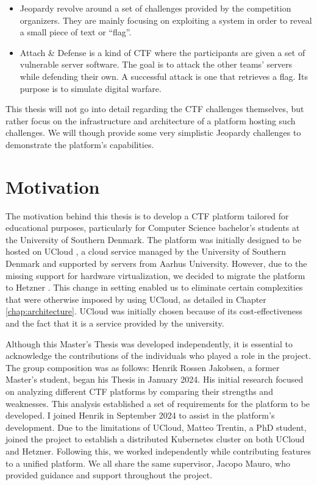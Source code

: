 \begin{itemize}
    \item Jeopardy revolve around a set of challenges provided by the competition organizers. They are mainly focusing on exploiting a system in order to reveal a small piece of text or ``flag''. 
    \item Attach \& Defense is a kind of CTF where the participants are given a set of vulnerable server software. The goal is to attack the other teams' servers while defending their own. A successful attack is one that retrieves a flag. Its purpose is to simulate digital warfare.
\end{itemize}

This thesis will not go into detail regarding the CTF challenges themselves, but rather focus on the infrastructure and architecture of a platform hosting such challenges. We will though provide some very simplistic Jeopardy challenges to demonstrate the platform's capabilities.

\section{Motivation}
The motivation behind this thesis is to develop a CTF platform tailored for educational purposes, particularly for Computer Science bachelor's students at the University of Southern Denmark. The platform was initially designed to be hosted on UCloud \Parencite{SDUCloud}, a cloud service managed by the University of Southern Denmark and supported by servers from Aarhus University. However, due to the missing support for hardware virtualization, we decided to migrate the platform to Hetzner \Parencite{Hetzner}. This change in setting enabled us to eliminate certain complexities that were otherwise imposed by using UCloud, as detailed in Chapter \ref{chap:architecture}. UCloud was initially chosen because of its cost-effectiveness and the fact that it is a service provided by the university.

Although this Master's Thesis was developed independently, it is essential to acknowledge the contributions of the individuals who played a role in the project. The group composition was as follows: Henrik Rossen Jakobsen, a former Master's student, began his Thesis in January 2024. His initial research focused on analyzing different CTF platforms by comparing their strengths and weaknesses. This analysis established a set of requirements for the platform to be developed. I joined Henrik in September 2024 to assist in the platform's development. Due to the limitations of UCloud, Matteo Trentin, a PhD student, joined the project to establish a distributed Kubernetes cluster on both UCloud and Hetzner. Following this, we worked independently while contributing features to a unified platform. We all share the same supervisor, Jacopo Mauro, who provided guidance and support throughout the project.

